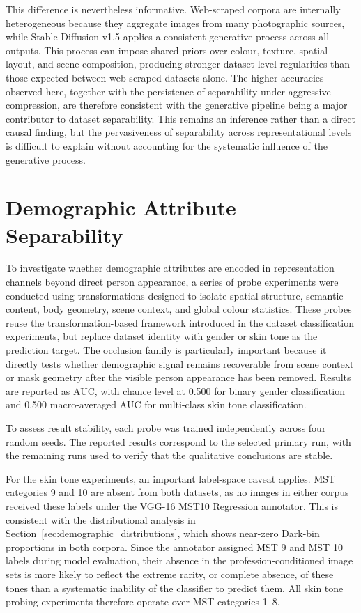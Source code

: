 This difference is nevertheless informative. Web-scraped corpora are internally heterogeneous because they aggregate images from many photographic sources, while Stable Diffusion v1.5 applies a consistent generative process across all outputs. This process can impose shared priors over colour, texture, spatial layout, and scene composition, producing stronger dataset-level regularities than those expected between web-scraped datasets alone. The higher accuracies observed here, together with the persistence of separability under aggressive compression, are therefore consistent with the generative pipeline being a major contributor to dataset separability. This remains an inference rather than a direct causal finding, but the pervasiveness of separability across representational levels is difficult to explain without accounting for the systematic influence of the generative process.

\section{Demographic Attribute Separability}
\label{sec:demographic_attribute_separability}

To investigate whether demographic attributes are encoded in representation channels beyond direct person appearance, a series of probe experiments were conducted using transformations designed to isolate spatial structure, semantic content, body geometry, scene context, and global colour statistics. These probes reuse the transformation-based framework introduced in the dataset classification experiments, but replace dataset identity with gender or skin tone as the prediction target. The occlusion family is particularly important because it directly tests whether demographic signal remains recoverable from scene context or mask geometry after the visible person appearance has been removed. Results are reported as AUC, with chance level at 0.500 for binary gender classification and 0.500 macro-averaged AUC for multi-class skin tone classification.

To assess result stability, each probe was trained independently across four random seeds. The reported results correspond to the selected primary run, with the remaining runs used to verify that the qualitative conclusions are stable.

For the skin tone experiments, an important label-space caveat applies. MST categories 9 and 10 are absent from both datasets, as no images in either corpus received these labels under the VGG-16 MST10 Regression annotator. This is consistent with the distributional analysis in Section~\ref{sec:demographic_distributions}, which shows near-zero Dark-bin proportions in both corpora. Since the annotator assigned MST 9 and MST 10 labels during model evaluation, their absence in the profession-conditioned image sets is more likely to reflect the extreme rarity, or complete absence, of these tones than a systematic inability of the classifier to predict them. All skin tone probing experiments therefore operate over MST categories 1--8.


